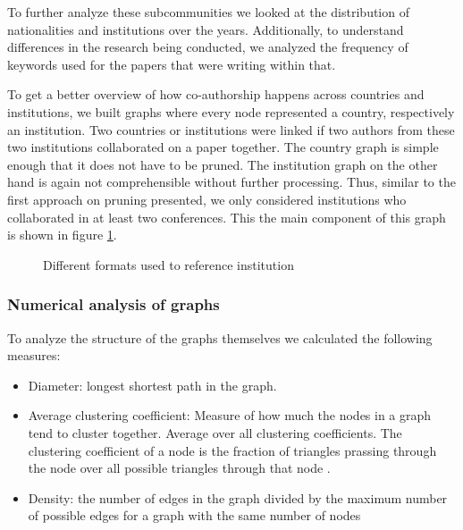 \documentclass[article,twocolumn]{IEEEtran}
\providecommand{\tightlist}{%
      \setlength{\itemsep}{0pt}\setlength{\parskip}{0pt}}
\begin{document}
    To further analyze these subcommunities we looked at the distribution of
nationalities and institutions over the years. Additionally, to
understand differences in the research being conducted, we analyzed the
frequency of keywords used for the papers that were writing within that.

To get a better overview of how co-authorship happens across countries
and institutions, we built graphs where every node represented a
country, respectively an institution. Two countries or institutions were
linked if two authors from these two institutions collaborated on a
paper together. The country graph is simple enough that it does not have
to be pruned. The institution graph on the other hand is again not
comprehensible without further processing. Thus, similar to the first
approach on pruning presented, we only considered institutions who
collaborated in at least two conferences. This the main component of
this graph is shown in figure \ref{unigraph}.


    \begin{figure}
        \begin{center}\end{center}
        \caption{Different formats used to reference institution}
        \label{unigraph}
    \end{figure}
    
    \hypertarget{numerical-analysis-of-graphs}{%
\subsubsection{Numerical analysis of
graphs}\label{numerical-analysis-of-graphs}}

To analyze the structure of the graphs themselves we calculated the
following measures:

\begin{itemize}
\tightlist
\item
  Diameter: longest shortest path in the graph.
\item
  Average clustering coefficient: Measure of how much the nodes in a
  graph tend to cluster together. Average over all clustering
  coefficients. The clustering coefficient of a node is the fraction of
  triangles prassing through the node over all possible triangles
  through that node \cite{watts1998collective}.
\item
  Density: the number of edges in the graph divided by the maximum
  number of possible edges for a graph with the same number of nodes
\end{itemize}
\end{document}
